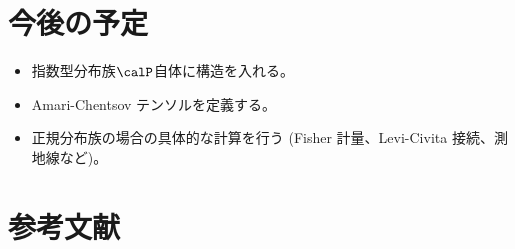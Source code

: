 \documentclass[report]{jlreq}
\begin{document}
%
\section*{今後の予定}

\begin{itemize}
    \item 指数型分布族$\calP$自体に構造を入れる。
    \item Amari-Chentsov テンソルを定義する。
    \item 正規分布族の場合の具体的な計算を行う
        (Fisher 計量、Levi-Civita 接続、測地線など)。
\end{itemize}

%
\section*{参考文献}

\nocite{amari_information_2016}
\nocite{bn1970_pdf}

{
    \renewcommand{\bibsection}{}
    
    
}
\end{document}
